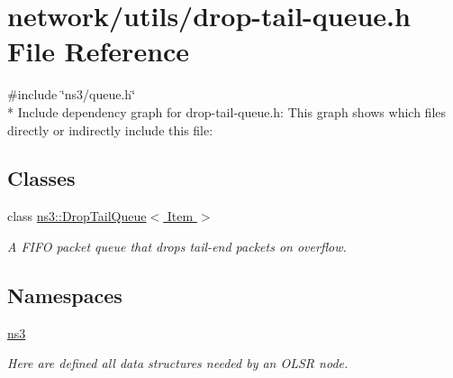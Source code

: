 \hypertarget{drop-tail-queue_8h}{}\section{network/utils/drop-\/tail-\/queue.h File Reference}
\label{drop-tail-queue_8h}
{\ttfamily \#include \char`\"{}ns3/queue.\+h\char`\"{}}\\*
Include dependency graph for drop-\/tail-\/queue.h\+:
This graph shows which files directly or indirectly include this file\+:
\subsection*{Classes}
\begin{DoxyCompactItemize}
\item 
class \hyperlink{classns3_1_1DropTailQueue}{ns3\+::\+Drop\+Tail\+Queue$<$ Item $>$}
\begin{DoxyCompactList}\small\item\em A F\+I\+FO packet queue that drops tail-\/end packets on overflow. \end{DoxyCompactList}\end{DoxyCompactItemize}
\subsection*{Namespaces}
\begin{DoxyCompactItemize}
\item 
 \hyperlink{namespacens3}{ns3}
\begin{DoxyCompactList}\small\item\em Here are defined all data structures needed by an O\+L\+SR node. \end{DoxyCompactList}\end{DoxyCompactItemize}
